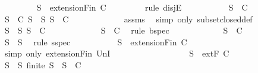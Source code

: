 \begin{isabellebody}
\ \ \ \ \ \ \ \isamarkupfalse%
\ {\isachardoublequoteopen}S{\isacharprime}\ {\isasymin}\ {\isacharparenleft}extensionFin\ C{\isacharparenright}{\isachardoublequoteclose}\isanewline
\ \ \ \ \ \ \ \isamarkupfalse%
\ {\isacharparenleft}rule\ disjE{\isacharparenright}\isanewline
\ \ \ \ \ \ \ \ \ \isamarkupfalse%
\ {\isachardoublequoteopen}S\ {\isasymin}\ C{\isachardoublequoteclose}\isanewline
\ \ \ \ \ \ \ \ \ \isamarkupfalse%
\ {\isachardoublequoteopen}{\isasymforall}S\ {\isasymin}\ C{\isachardot}\ {\isasymforall}S{\isacharprime}\ {\isasymsubseteq}\ S{\isachardot}\ S{\isacharprime}\ {\isasymin}\ C{\isachardoublequoteclose}\isanewline
\ \ \ \ \ \ \ \ \ \ \ \isamarkupfalse%
\ assms\ \isamarkupfalse%
\ {\isacharparenleft}simp\ only{\isacharcolon}\ subset{\isacharunderscore}closed{\isacharunderscore}def{\isacharparenright}\isanewline
\ \ \ \ \ \ \ \ \ \isamarkupfalse%
\ \isamarkupfalse%
\ {\isachardoublequoteopen}{\isasymforall}S{\isacharprime}\ {\isasymsubseteq}\ S{\isachardot}\ S{\isacharprime}\ {\isasymin}\ C{\isachardoublequoteclose}\isanewline
\ \ \ \ \ \ \ \ \ \ \ \isamarkupfalse%
\ {\isacartoucheopen}S\ {\isasymin}\ C{\isacartoucheclose}\ \isamarkupfalse%
\ {\isacharparenleft}rule\ bspec{\isacharparenright}\isanewline
\ \ \ \ \ \ \ \ \ \isamarkupfalse%
\ \isamarkupfalse%
\ {\isachardoublequoteopen}S{\isacharprime}\ {\isasymin}\ C{\isachardoublequoteclose}\isanewline
\ \ \ \ \ \ \ \ \ \ \ \isamarkupfalse%
\ {\isacartoucheopen}S{\isacharprime}\ {\isasymsubseteq}\ S{\isacartoucheclose}\ \isamarkupfalse%
\ {\isacharparenleft}rule\ sspec{\isacharparenright}\isanewline
\ \ \ \ \ \ \ \ \ \isamarkupfalse%
\ {\isachardoublequoteopen}S{\isacharprime}\ {\isasymin}\ {\isacharparenleft}extensionFin\ C{\isacharparenright}{\isachardoublequoteclose}\ \isanewline
\ \ \ \ \ \ \ \ \ \ \ \isamarkupfalse%
\ {\isacharparenleft}simp\ only{\isacharcolon}\ extensionFin\ UnI{}{\isacharparenright}\isanewline
\ \ \ \ \ \ \ \isamarkupfalse%
\isanewline
\ \ \ \ \ \ \ \ \ \isamarkupfalse%
\ {\isachardoublequoteopen}S\ {\isasymin}\ {\isacharparenleft}extF\ C{\isacharparenright}{\isachardoublequoteclose}\isanewline
\ \ \ \ \ \ \ \ \ \isamarkupfalse%
\ \isamarkupfalse%
\ {\isachardoublequoteopen}{\isasymforall}S{\isacharprime}\ {\isasymsubseteq}\ S{\isachardot}\ finite\ S{\isacharprime}\ {\isasymlongrightarrow}\ S{\isacharprime}\ {\isasymin}\ C{\isachardoublequoteclose}\isanewline

\end{isabellebody}
